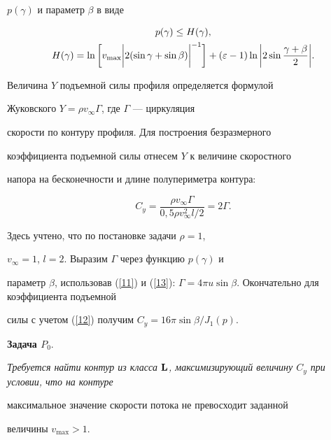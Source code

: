 $p(\gamma)$ и параметр $\beta$ в виде


\begin{gather}\label {3}


p(\gamma)\leq H(\gamma), \\


%


H(\gamma)=


\ln \bigg[v_{\max}


\bigg|2(\sin\gamma + \sin\beta)\bigg|^{-1}\bigg]+


(\varepsilon-1)\ln\bigg|2\sin\frac{\gamma+\beta}{2}\bigg|.\notag


\end{gather}





Величина $Y$ подъемной силы профиля определяется формулой


Жуковского $Y=\rho v_\infty \Gamma$, где $ \Gamma$ --- циркуляция


скорости по контуру профиля. Для построения безразмерного


коэффициента подъемной силы отнесем $Y$ к величине скоростного


напора на бесконечности и длине полупериметра контура:


$$


C_y=\frac{\rho v_\infty \Gamma}{0{,}5\rho v^2_\infty


l/2}=2\Gamma.


$$


Здесь учтено, что по постановке задачи $\rho=1$,


$v_\infty=1$, $l=2$. Выразим $\Gamma$ через функцию $p(\gamma)$ и


параметр $\beta$, использовав (\ref{11}) и (\ref{13}): $


\Gamma=4\pi u \sin\beta$. Окончательно для коэффициента подъемной


силы с учетом (\ref{12}) получим $C_y=16\pi \sin\beta/J_{1}(p)$.


\medskip





{\bf Задача $P_{0}$}. {\it Требуется найти контур из класса ${\bold


L}$, максимизирующий величину $C_{y}$ при условии, что на контуре


максимальное значение скорости потока не превосходит заданной


величины $v_{\max}>1$.}


